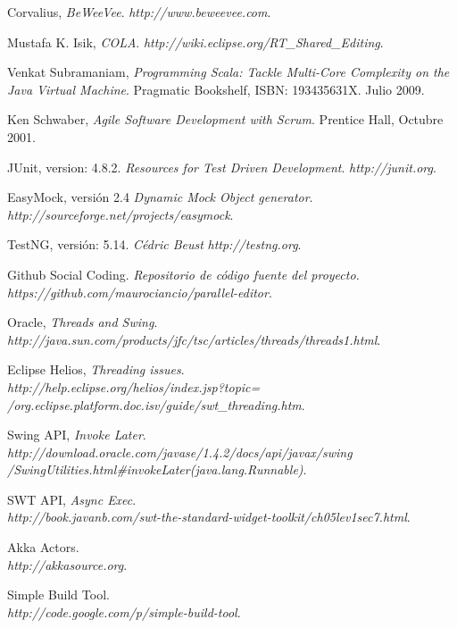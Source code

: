 \documentclass[12pt,a4paper]{article}
\begin{document}
\begin{thebibliography}{9}
	Corvalius,
	\emph{BeWeeVee}. 
	\textsl{http://www.beweevee.com}.
	
	Mustafa K. Isik,
	\emph{COLA}. 
	\textsl{ http://wiki.eclipse.org/RT\_Shared\_Editing}.

	Venkat Subramaniam,
	\emph{Programming Scala: Tackle Multi-Core Complexity on the Java Virtual Machine}.
	Pragmatic Bookshelf, ISBN: 193435631X.
	Julio 2009.

	Ken Schwaber,
	\emph{Agile Software Development with Scrum}.
	Prentice Hall, 
	Octubre 2001.

	JUnit, version: 4.8.2.
	\emph{Resources for Test Driven Development}.
	\textsl{http://junit.org}.

	EasyMock, versión 2.4
	\emph{Dynamic Mock Object generator}. \\
	\textsl{http://sourceforge.net/projects/easymock}.

	TestNG, versión: 5.14.
	\emph{Cédric Beust} 
	\textsl{http://testng.org}.

	Github Social Coding.
	\emph{Repositorio de código fuente del proyecto.} 
	\textsl{https://github.com/maurociancio/parallel-editor}.
	
	Oracle, \emph{Threads and Swing}. \\
	\textsl{http://java.sun.com/products/jfc/tsc/articles/threads/threads1.html}.

	Eclipse Helios, \emph{Threading issues}. \\
	\textsl{http://help.eclipse.org/helios/index.jsp?topic=\\
	/org.eclipse.platform.doc.isv/guide/swt\_threading.htm}.

	Swing API, \textsl{Invoke Later}. \\
	\textsl{http://download.oracle.com/javase/1.4.2/docs/api/javax/swing\\
	/SwingUtilities.html\#invokeLater(java.lang.Runnable)}.

	SWT API, \emph{Async Exec}. \\
	\textsl{http://book.javanb.com/swt-the-standard-widget-toolkit/ch05lev1sec7.html}.
	
	Akka Actors. \\
	\textsl{http://akkasource.org}.
	
	Simple Build Tool. \\
	\textsl{http://code.google.com/p/simple-build-tool}.
	

\end{thebibliography}
\end{document}
